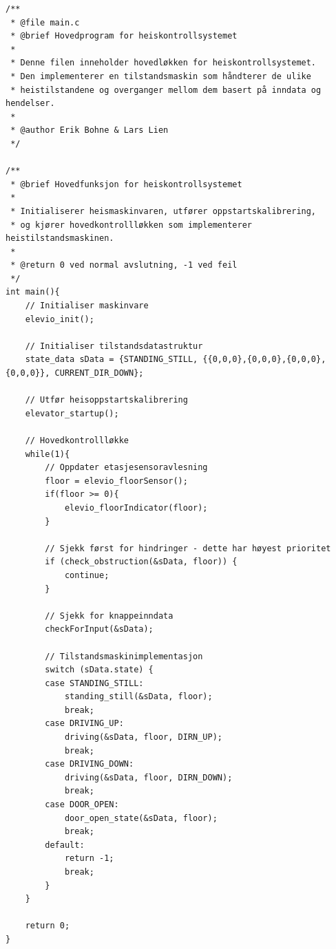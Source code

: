 \begin{lstlisting}[style=cpp, caption=Hovedfunksjonen]
/**
 * @file main.c
 * @brief Hovedprogram for heiskontrollsystemet
 *
 * Denne filen inneholder hovedløkken for heiskontrollsystemet.
 * Den implementerer en tilstandsmaskin som håndterer de ulike
 * heistilstandene og overganger mellom dem basert på inndata og hendelser.
 *
 * @author Erik Bohne & Lars Lien
 */

/**
 * @brief Hovedfunksjon for heiskontrollsystemet
 *
 * Initialiserer heismaskinvaren, utfører oppstartskalibrering,
 * og kjører hovedkontrollløkken som implementerer heistilstandsmaskinen.
 *
 * @return 0 ved normal avslutning, -1 ved feil
 */
int main(){
    // Initialiser maskinvare
    elevio_init();
    
    // Initialiser tilstandsdatastruktur
    state_data sData = {STANDING_STILL, {{0,0,0},{0,0,0},{0,0,0},{0,0,0}}, CURRENT_DIR_DOWN};
    
    // Utfør heisoppstartskalibrering
    elevator_startup();

    // Hovedkontrollløkke
    while(1){
        // Oppdater etasjesensoravlesning
        floor = elevio_floorSensor();
        if(floor >= 0){
            elevio_floorIndicator(floor);
        }
        
        // Sjekk først for hindringer - dette har høyest prioritet
        if (check_obstruction(&sData, floor)) {
            continue;
        }
        
        // Sjekk for knappeinndata
        checkForInput(&sData);

        // Tilstandsmaskinimplementasjon
        switch (sData.state) {
        case STANDING_STILL:
            standing_still(&sData, floor);
            break;
        case DRIVING_UP:
            driving(&sData, floor, DIRN_UP);
            break;
        case DRIVING_DOWN:
            driving(&sData, floor, DIRN_DOWN);
            break;
        case DOOR_OPEN:
            door_open_state(&sData, floor);
            break;
        default:
            return -1;
            break;
        }
    }
    
    return 0;
}
\end{lstlisting}